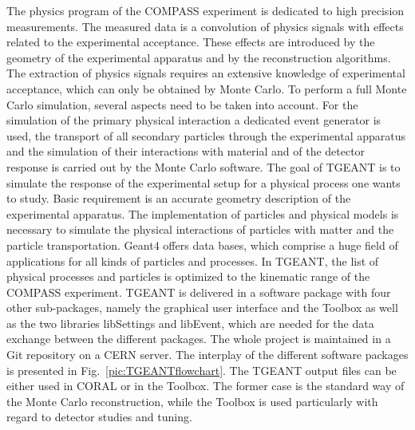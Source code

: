 The physics program of the COMPASS experiment is dedicated to high precision measurements. The measured data is a convolution of physics signals with effects related to the experimental acceptance. These effects are introduced by the geometry of the experimental apparatus and by the reconstruction algorithms. The extraction of physics signals requires an extensive knowledge of experimental acceptance, which can only be obtained by Monte Carlo.
To perform a full Monte Carlo simulation, several aspects need to be taken into account. For the simulation of the primary physical interaction a dedicated event generator is used, the transport of all secondary particles through the experimental apparatus and the simulation of their interactions with material and of the detector response is carried out by the Monte Carlo software.
The goal of TGEANT is to simulate the response of the experimental setup for a physical process one wants to study. Basic requirement is an accurate geometry description of the experimental apparatus. The implementation of particles and physical models is necessary to simulate the physical interactions of particles with matter and the particle transportation. Geant$4$ offers data bases, which comprise a huge field of applications for all kinds of particles and processes. In TGEANT, the list of physical processes and particles is optimized to the kinematic range of the COMPASS experiment.
TGEANT is delivered in a software package with four other sub-packages, namely the graphical user interface and the Toolbox as well as the two libraries libSettings and libEvent, which are needed for the data exchange between the different packages. The whole project is maintained in a Git repository on a CERN server. The interplay of the different software packages is presented in Fig.~\ref{pic:TGEANTflowchart}. The TGEANT output files can be either used in CORAL or in the Toolbox. The former case is the standard way of the Monte Carlo reconstruction, while the Toolbox is used particularly with regard to detector studies and tuning.


